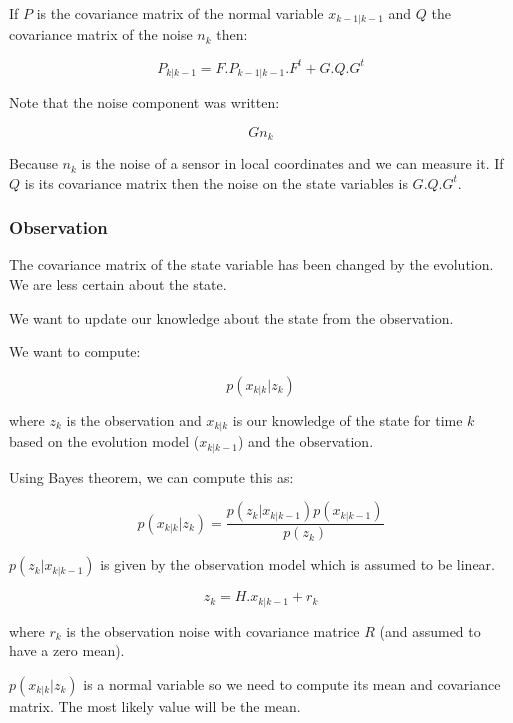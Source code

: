 \documentclass[titlepage,a4,12pt]{article}
\numberwithin{equation}{subsection}
\newcommand{\curr}[1]{#1_{k-1|k-1}}
\newcommand{\before}[1]{#1_{k|k-1}}
\newcommand{\after}[1]{#1_{k|k}}
\begin{document}
If $P$ is the covariance matrix of the normal variable $\curr{x}$ and $Q$ the covariance matrix of the noise $n_k$ then:

\begin{equation} \label{eq:covariance}
\before{P} = F . \curr{P} . F^t + G . Q . G^t
\end{equation}

Note that the noise component was written:

\begin{equation} \label{eq:noisecomponent}
G n_{k}
\end{equation}

Because $n_{k}$ is the noise of a sensor in local coordinates and we can measure it. If $Q$ is its covariance matrix then the noise on the state variables is $G . Q . G^t$.


\subsubsection{Observation}

The covariance matrix of the state variable has been changed by the evolution. We are less certain about the state.

We want to update our knowledge about the state from the observation.

We want to compute:

\begin{equation} 
p(\after{x} | z_k)
\end{equation}

where $z_k$ is the observation and $\after{x}$ is our knowledge of the state for time $k$ based on the evolution model ($\before{x}$) and the observation.

Using Bayes theorem, we can compute this as:

\begin{equation} 
p(\after{x} | z_k) = \frac{p(z_k | \before{x}) p(\before{x})}{p(z_k)}
\end{equation}


$p(z_k | \before{x})$ is given by the observation model which is assumed to be linear.

\begin{equation} 
z_k = H . \before{x} + r_k
\end{equation}

where $r_k$ is the observation noise with covariance matrice $R$ (and assumed to have a zero mean).

$p(\after{x} | z_k)$ is a normal variable so we need to compute its mean and covariance matrix. The most likely value will be the mean.
\end{document}
